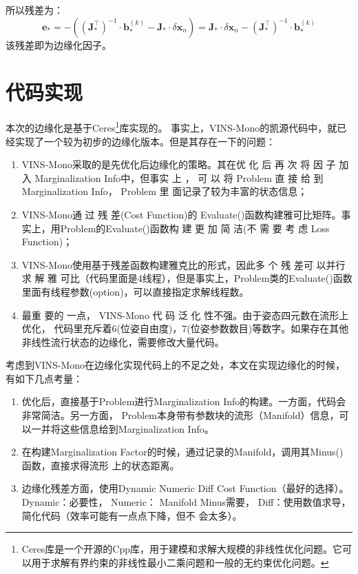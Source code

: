 \documentclass[12pt, onecolumn]{article}
\newcommand\normf{\fangsong}
\begin{document}
		所以残差为：
		\begin{equation}
		\boldsymbol{e}_*=-\left( \left( {\boldsymbol{J}_*^\top}\right) ^{-1}\cdot\boldsymbol{b}_*^{(k)} -\boldsymbol{J}_*\cdot\delta\boldsymbol{x}_n\right) =\boldsymbol{J}_*\cdot\delta\boldsymbol{x}_n-\left( {\boldsymbol{J}_*^\top}\right) ^{-1}\cdot\boldsymbol{b}_*^{(k)}
		\end{equation}
		该残差即为边缘化因子。
		
		\section{\normf 代码实现}
		本次的边缘化是基于Ceres\footnote{\normf Ceres库是一个开源的Cpp库，用于建模和求解大规模的非线性优化问题。它可以用于求解有界约束的非线性最小二乘问题和一般的无约束优化问题。}库\cite{Agarwal_Ceres_Solver_2022}实现的。
		事实上，VINS-Mono\cite{qin2018vins}的凯源代码中，就已经实现了一个较为初步的边缘化版本。但是其存在一下的问题：
		\begin{enumerate}
		\item VINS-Mono采取的是先优化后边缘化的策略。其在优 化 后 再 次 将 因 子 加 入
		Marginalization Info中，但事实
		上 ， 可 以 将 Problem 直 接 给 到
		Marginalization Info， Problem 里 面记录了较为丰富的状态信息；
		
		\item VINS-Mono通 过 残 差(Cost Function)的
		Evaluate()函数构建雅可比矩阵。事
		实上，用Problem的Evaluate()函数构
		建 更 加 简 洁(不 需 要 考 虑 Loss
		Function)；
		
		\item VINS-Mono使用基于残差函数构建雅克比的形式，因此多 个 残 差可 以并行 求 解 雅
		可比（代码里面是4线程），但是事实上，Problem类的Evaluate()函数
		里面有线程参数(option)，可以直接指定求解线程数。
		
		\item 最重 要的 一点， VINS-Mono 代 码 泛 化
		性不强。由于姿态四元数在流形上优化，
		代码里充斥着6(位姿自由度)，7(位姿参数数目)等数字。如果存在其他非线性流行状态的边缘化，需要修改大量代码。
		\end{enumerate}
		
		考虑到VINS-Mono在边缘化实现代码上的不足之处，本文在实现边缘化的时候，有如下几点考量：
		\begin{enumerate}
		\item 优化后，直接基于Problem进行Marginalization Info的构建。一方面，代码会非常简洁。另一方面，
		Problem本身带有参数块的流形（Manifold）信息，可以一并将这些信息给到Marginalization Info。
		
		\item 在构建Marginalization Factor的时候，通过记录的Manifold，调用其Minus()函数，直接求得流形
		上的状态距离。
		
		\item 边缘化残差方面，使用Dynamic Numeric Diff Cost Function（最好的选择）。 Dynamic：必要性，
		Numeric： Manifold Minus需要， Diff：使用数值求导，简化代码（效率可能有一点点下降，但不
		会太多）。
		\end{enumerate}
		
\end{document}

